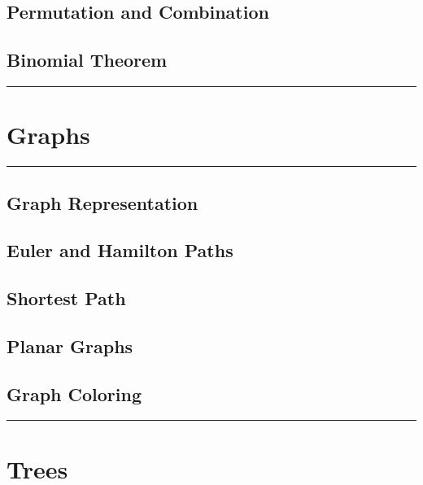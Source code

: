 \documentclass[]{book}
\begin{document}
\section{Permutation and Combination}\label{permutation-and-combination}

\section{Binomial Theorem}\label{binomial-theorem}

\begin{center}\rule{0.5\linewidth}{\linethickness}\end{center}

\chapter{Graphs}\label{graphs}

\begin{center}\rule{0.5\linewidth}{\linethickness}\end{center}

\section{Graph Representation}\label{graph-representation}

\section{Euler and Hamilton Paths}\label{euler-and-hamilton-paths}

\section{Shortest Path}\label{shortest-path}

\section{Planar Graphs}\label{planar-graphs}

\section{Graph Coloring}\label{graph-coloring}

\begin{center}\rule{0.5\linewidth}{\linethickness}\end{center}

\chapter{Trees}\label{trees}
\end{document}
